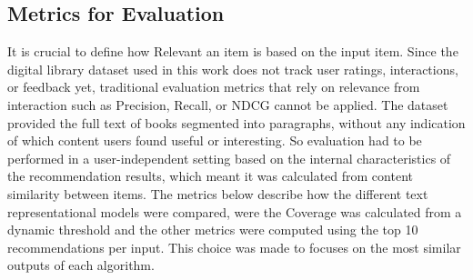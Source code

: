 \documentclass[\myFontSize,a4paper,oneside,hidelinks]{article}
\begin{document}
\subsection{Metrics for Evaluation}
It is crucial to define how Relevant an item is based on the input item. Since the digital library dataset used in this work does not track user ratings, interactions, or feedback yet, traditional evaluation metrics that rely on relevance from interaction such as Precision, Recall, or NDCG cannot be applied. The dataset provided the full text of books segmented into paragraphs, without any indication of which content users found useful or interesting. So evaluation had to be performed in a user-independent setting based on the internal characteristics of the recommendation results, which meant it was calculated from content similarity between items.
The metrics below describe how the different text representational models were compared, were the Coverage was calculated from a dynamic threshold and the other metrics were computed using the top 10 recommendations per input. This choice was made to focuses on the most similar outputs of each algorithm. 
\end{document}
